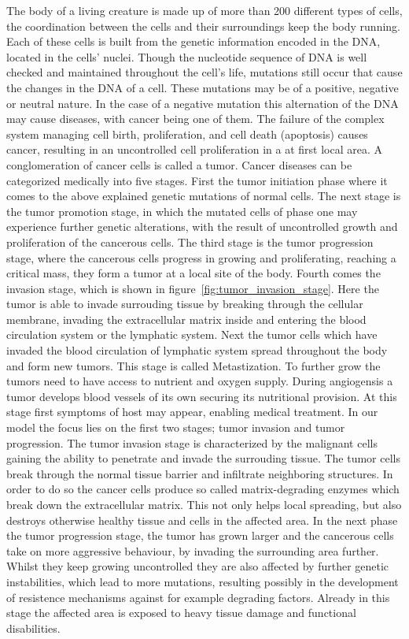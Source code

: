 The body of a living creature is made up of more than 200 different types of cells, the coordination between the cells and their surroundings keep the body running. Each of these cells is built from the genetic information encoded in the DNA, located in the cells' nuclei. Though the nucleotide sequence of DNA is well checked and maintained throughout the cell's life, mutations still occur that cause the changes in the DNA of a cell. These mutations may be of a positive, negative or neutral nature. In the case of a negative mutation this alternation of the DNA may cause diseases, with cancer being one of them. The failure of the complex system managing cell birth, proliferation, and cell death (apoptosis) causes cancer, resulting in an uncontrolled cell proliferation in a at first local area. A conglomeration of cancer cells is called a tumor. \newline
Cancer diseases can be categorized medically into five stages. First the tumor initiation phase where it comes to the above explained genetic mutations of normal cells. The next stage is the tumor promotion stage, in which the mutated cells of phase one may experience further genetic alterations, with the result of uncontrolled growth and proliferation of the cancerous cells. The third stage is the tumor progression stage, where the cancerous cells progress in growing and proliferating, reaching a critical mass, they form a tumor at a local site of the body. Fourth comes the invasion stage, which is shown in figure~\ref{fig:tumor_invasion_stage}. Here the tumor is able to invade surrouding tissue by breaking through the cellular membrane, invading the extracellular matrix inside and entering the blood circulation system or the lymphatic system. Next the tumor cells which have invaded the blood circulation of lymphatic system spread throughout the body and form new tumors. This stage is called Metastization. To further grow the tumors need to have access to nutrient and oxygen supply. During angiogensis a tumor develops blood vessels of its own securing its nutritional provision. At this stage first symptoms of host may appear, enabling medical treatment.\newline
In our model the focus lies on the first two stages; tumor invasion and tumor progression. The tumor invasion stage is characterized by the malignant cells gaining the ability to penetrate and invade the surrouding tissue. The tumor cells break through the normal tissue barrier and infiltrate neighboring structures. In order to do so the cancer cells produce so called matrix-degrading enzymes which break down the extracellular matrix. This not only helps local spreading, but also destroys otherwise healthy tissue and cells in the affected area. In the next phase the tumor progression stage, the tumor has grown larger and the cancerous cells take on more aggressive behaviour, by invading the surrounding area further. Whilst they keep growing uncontrolled they are also affected by further genetic instabilities, which lead to more mutations, resulting possibly in the development of resistence mechanisms against for example degrading factors. Already in this stage the affected area is exposed to heavy tissue damage and functional disabilities.\newline
